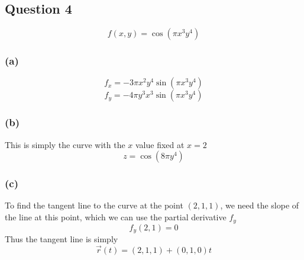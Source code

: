 \documentclass{article}
\begin{document}
\subsection*{Question 4}
\[
f(x,y) = \cos(\pi x^3 y^4)
\]

\subsubsection*{(a)}
\[
f_x = -3\pi x^2 y^4 \sin(\pi x^3y^4)
\]
\[
f_y= -4\pi y^3x^3 \sin(\pi x^3 y^4)
\]

\subsubsection*{(b)}
This is simply the curve with the \(x\) value fixed at \(x = 2\)
\[
z = \cos(8\pi y^4)
\]

\subsubsection*{(c)}
To find the tangent line to the curve at the point \((2,1,1)\), we need the slope of the line at this point,
which we can use the partial derivative \(f_y\)
\[
f_y (2,1) = 0
\]
Thus the tangent line is simply 
\[
\vec{r}(t) = (2,1,1) + (0,1,0) t
\]
\end{document}
